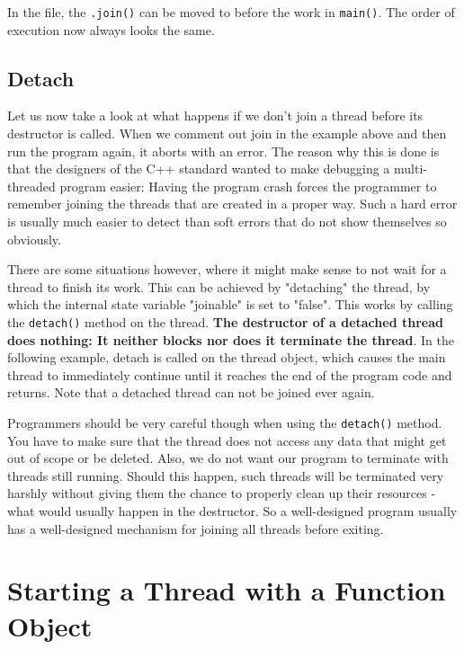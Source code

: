 \documentclass[11pt, a4paper]{article}
\begin{document}
In the file, the \texttt{.join()} can be moved to before the work in \texttt{main()}. The order of execution now always looks the same.


\subsection{Detach}%
\label{sub:detach}



Let us now take a look at what happens if we don’t join a thread before its destructor is called. When we comment out join in the example above and then run the program again, it aborts with an error. The reason why this is done is that the designers of the C++ standard wanted to make debugging a multi-threaded program easier: Having the program crash forces the programmer to remember joining the threads that are created in a proper way. Such a hard error is usually much easier to detect than soft errors that do not show themselves so obviously.

There are some situations however, where it might make sense to not wait for a thread to finish its work. This can be achieved by "detaching" the thread, by which the internal state variable "joinable" is set to "false". This works by calling the \texttt{detach()} method on the thread. \textbf{The destructor of a detached thread does nothing: It neither blocks nor does it terminate the thread}. In the following example, detach is called on the thread object, which causes the main thread to immediately continue until it reaches the end of the program code and returns. Note that a detached thread can not be joined ever again.


Programmers should be very careful though when using the \texttt{detach()} method. You have to make sure that the thread does not access any data that might get out of scope or be deleted. Also, we do not want our program to terminate with threads still running. Should this happen, such threads will be terminated very harshly without giving them the chance to properly clean up their resources - what would usually happen in the destructor. So a well-designed program usually has a well-designed mechanism for joining all threads before exiting.





\section{Starting a Thread with a Function Object}%
\label{sec:starting_a_thread_with_a_function_object}
\end{document}
